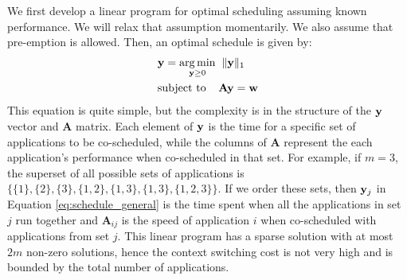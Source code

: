 We first develop a linear program for optimal scheduling assuming
known performance. We will relax that assumption momentarily.  We also
assume that pre-emption is allowed. Then, an optimal schedule is given
by:
\begin{equation}
\begin{aligned}
\centering
			\label{eq:schedule_general}
			&   \y =\underset{  \y \geq 0}{\argmin} \;\;   \| \y \|_1\\
			&   \text{subject to} \;\;\;\; \mathbf{A} \y = \w
\end{aligned}
\end{equation}
This equation is quite simple, but the complexity is in the structure
of the $\mathbf{y}$ vector and $\mathbf{A}$ matrix.  Each element of $\mathbf{y}$ is
the time for a specific set of applications to be co-scheduled, while
the columns of $\mathbf{A}$ represent the each application's
performance when co-scheduled in that set.  For example, if $m = 3$,
the superset of all possible sets of applications is $\{ \{ 1 \},
\{2\}, \{3\}, \{1,2\}, \{1,3\},\{1,3\}, \{1,2,3\} \}$.  If we order
these sets, then $\mathbf{y}_j$ in Equation \eqref{eq:schedule_general} is the
time spent when all the applications in set $j$ run together and
$\mathbf{A}_{ij}$ is the speed of application $i$ when co-scheduled
with applications from set $j$.  This linear program has a sparse
solution with at most $2m$ non-zero solutions, hence the context
switching cost is not very high and is bounded by the total number of
applications.


